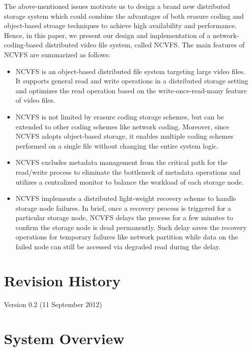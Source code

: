 \documentclass{article}
\begin{document}
The above-mentioned issues motivate us to design a brand new distributed 
storage
system which could combine the advantages of both erasure coding and 
object-based
stroage techniques to achieve high availability and performance. 
Hence, in this paper, we present our design and implementation of a 
network-coding-based distributed video file system, called NCVFS.  
The main features of NCVFS are summarized as follows:

\begin{itemize}

	\item NCVFS is an object-based distributed file system targeting 
		large video files. It supports general read and write operations 
		in a distributed storage setting and optimizes the read operation 
		based on the write-once-read-many feature of video files.

	\item NCVFS is not limited by erasure coding storage schemes, but can 
		be extended	to other coding schemes like network coding. 
		Moreover, since NCVFS adopts object-based storage, it enables 
		multiple coding schemes performed on a single file without 
		changing the entire system logic.

	\item NCVFS excludes metadata management from the critical path for the
		read/write process to eliminate the bottleneck of metadata operations 
		and utilizes a centralized monitor to balance the workload of each
		storage node.

	\item NCVFS implements a distributed light-weight recovery scheme to 
		handle storage node failures. In brief, once a recovery process
		is triggered for a particular storage node, NCVFS delays the
		process for a few minutes to confirm the storage node is
		dead permanently. Such delay saves the recovery operations
		for temporary failures like network partition while data on 
		the failed node can still be accessed via degraded read during
		the delay.

\end{itemize}

\section{Revision History}
Version 0.2 (11 September 2012)

\section{System Overview}
\end{document}
